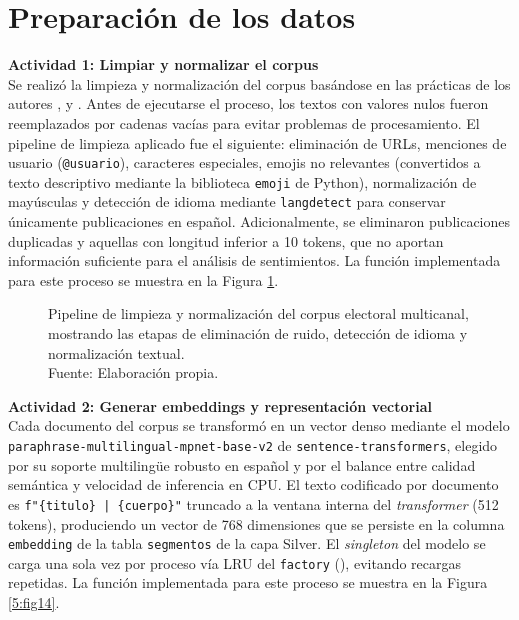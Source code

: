 \section{Preparación de los datos}

\textbf{Actividad 1: Limpiar y normalizar el corpus}
\\
Se realizó la limpieza y normalización del corpus basándose en las prácticas de los
autores \cite{pr_alvi2023twitter_election_review}, \cite{pr_mendonca2025bertopic_political}
y \cite{pr_alvarez2023llm_political}. Antes de ejecutarse el proceso, los textos con
valores nulos fueron reemplazados por cadenas vacías para evitar problemas de
procesamiento. El pipeline de limpieza aplicado fue el siguiente: eliminación de URLs,
menciones de usuario (\texttt{@usuario}), caracteres especiales, emojis no relevantes
(convertidos a texto descriptivo mediante la biblioteca \texttt{emoji} de Python),
normalización de mayúsculas y detección de idioma mediante \texttt{langdetect}
para conservar únicamente publicaciones en español. Adicionalmente, se eliminaron
publicaciones duplicadas y aquellas con longitud inferior a 10 tokens, que no aportan
información suficiente para el análisis de sentimientos. La función implementada
para este proceso se muestra en la Figura \ref{5:fig12}.

\begin{figure}[!ht]
    \begin{center}
        \resizebox{0.38\textwidth}{!}{}
        \caption[Pipeline de limpieza y normalización del corpus electoral multicanal]{Pipeline de limpieza y normalización del corpus electoral multicanal, mostrando las etapas de eliminación de ruido, detección de idioma y normalización textual.\\Fuente: Elaboración propia.}
        \label{5:fig12}
    \end{center}
\end{figure}

\textbf{Actividad 2: Generar embeddings y representación vectorial}
\\
Cada documento del corpus se transformó en un vector denso mediante el modelo
\texttt{paraphrase-multilingual-mpnet-base-v2} de \texttt{sentence-transformers},
elegido por su soporte multilingüe robusto en español y por el balance entre
calidad semántica y velocidad de inferencia en CPU. El texto codificado por
documento es \texttt{f"\{titulo\} | \{cuerpo\}"} truncado a la ventana interna del
\textit{transformer} (512 tokens), produciendo un vector de 768 dimensiones que se
persiste en la columna \texttt{embedding} de la tabla \texttt{segmentos} de la capa
Silver. El \textit{singleton} del modelo se carga una sola vez por proceso vía LRU
del \texttt{factory}
(), evitando recargas repetidas. La
función implementada para este proceso se muestra en la Figura \ref{5:fig14}.

